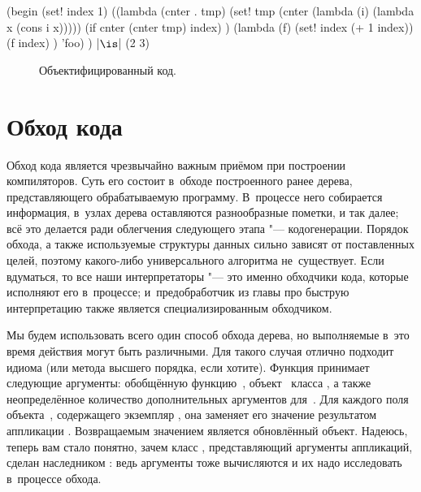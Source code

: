 \begin{code:lisp}
(begin
  (set! index 1)
  ((lambda (cnter . tmp)
     (set! tmp (cnter (lambda (i) (lambda x (cons i x)))))
     (if cnter (cnter tmp) index) )
   (lambda (f)
     (set! index (+ 1 index))
     (f index) )
   'foo) )        |$\is$| (2 3)
\end{code:lisp}

\begin{figure}\centering

\caption{Объектифицированный код.}%
\label{cc/objectification/pic:result}
\end{figure}


\section{Обход кода}\label{cc/sect:code-walk}

Обход кода является чрезвычайно важным приёмом при построении компиляторов.
\cite{cur89,wat93} Суть его состоит в~обходе построенного ранее дерева,
представляющего обрабатываемую программу. В~процессе него собирается информация,
в~узлах дерева оставляются разнообразные пометки, и так далее; всё это делается
ради облегчения следующего этапа "--- кодогенерации. Порядок обхода, а также
используемые структуры данных сильно зависят от поставленных целей, поэтому
какого-либо универсального алгоритма не~существует. Если вдуматься, то все наши
интерпретаторы "--- это именно обходчики кода, которые исполняют его в~процессе;
и~предобработчик  из главы про быструю интерпретацию
 также является специализированным обходчиком.

Мы будем использовать всего один способ обхода дерева, но выполняемые в~это
время действия могут быть различными. Для такого случая отлично подходит идиома
 (или метода высшего порядка, если хотите). Функция
 принимает следующие аргументы: обобщённую функцию~,
объект~ класса , а также неопределённое количество
дополнительных аргументов для~. Для каждого поля~ объекта~,
содержащего экземпляр , она заменяет его значение результатом
аппликации . Возвращаемым значением 
является обновлённый объект. Надеюсь, теперь вам стало понятно, зачем класс
, представляющий аргументы аппликаций, сделан наследником
: ведь аргументы тоже вычисляются и их надо исследовать в~процессе
обхода.

